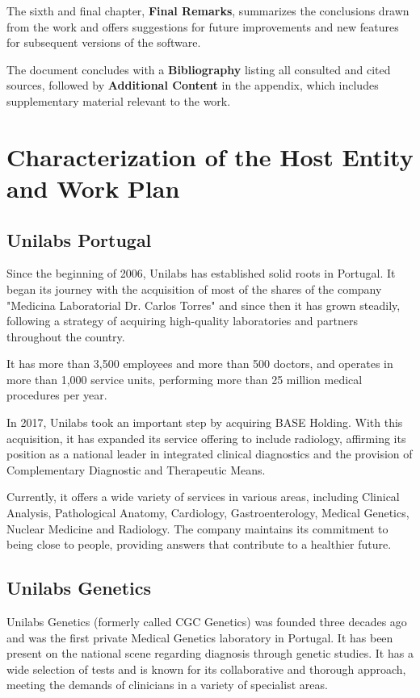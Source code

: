 The sixth and final chapter, \textbf{Final Remarks}, summarizes the conclusions drawn from the work and offers suggestions for future improvements and new features for subsequent versions of the software.

The document concludes with a \textbf{Bibliography} listing all consulted and cited sources, followed by \textbf{Additional Content} in the appendix, which includes supplementary material relevant to the work.

\section{Characterization of the Host Entity and Work Plan} \label{sec:intro_characterization}
\subsection{Unilabs Portugal} \label{subsec:unilabs}

Since the beginning of 2006, Unilabs has established solid roots in Portugal. It began its journey with the acquisition of most of the shares of the company "Medicina Laboratorial Dr. Carlos Torres" and since then it has grown steadily, following a strategy of acquiring high-quality laboratories and partners throughout the country. \cite{unilabs_sobre}

It has more than 3,500 employees and more than 500 doctors, and operates in more than 1,000 service units, performing more than 25 million medical procedures per year. \cite{unilabs_sobre}

In 2017, Unilabs took an important step by acquiring BASE Holding. With this acquisition, it has expanded its service offering to include radiology, affirming its position as a national leader in integrated clinical diagnostics and the provision of Complementary Diagnostic and Therapeutic Means. \cite{unilabs_sobre}

Currently, it offers a wide variety of services in various areas, including Clinical Analysis, Pathological Anatomy, Cardiology, Gastroenterology, Medical Genetics, Nuclear Medicine and Radiology. The company maintains its commitment to being close to people, providing answers that contribute to a healthier future. \cite{unilabs_sobre}

\subsection{Unilabs Genetics} \label{subsec:unilabs_genetics}
Unilabs Genetics (formerly called CGC Genetics) was founded three decades ago and was the first private Medical Genetics laboratory in Portugal. It has been present on the national scene regarding diagnosis through genetic studies. It has a wide selection of tests and is known for its collaborative and thorough approach, meeting the demands of clinicians in a variety of specialist areas. \cite{unilabs_genetica}

